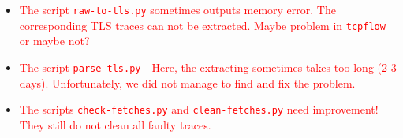 \begin{itemize}
  \item \textcolor{red}{The script \texttt{raw-to-tls.py} sometimes outputs memory error. The corresponding \ac{TLS} traces can not be extracted. Maybe problem in \texttt{tcpflow} or maybe not?}
  \item \textcolor{red}{The script \texttt{parse-tls.py} - Here, the extracting sometimes takes too long (2-3 days). Unfortunately, we did not manage to find and fix the problem.}
  \item \textcolor{red}{The scripts \texttt{check-fetches.py} and \texttt{clean-fetches.py} need improvement! They still do not clean all faulty traces.}
\end{itemize}

